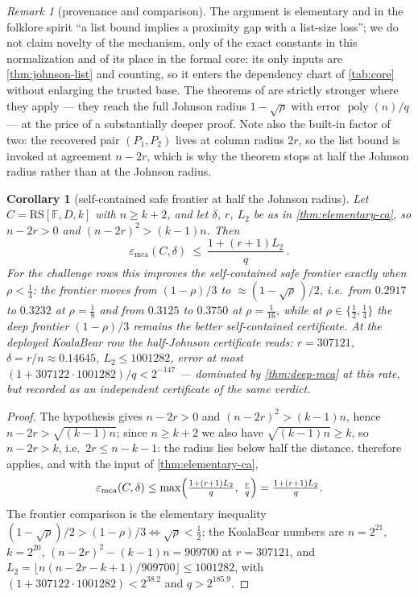 \documentclass[11pt]{article}
\newtheorem{corollary}[theorem]{Corollary}
\theoremstyle{definition}
\theoremstyle{remark}
\newtheorem{remark}[theorem]{Remark}
\newcommand{\F}{\mathbb{F}}
\newcommand{\RS}{\mathrm{RS}}
\newcommand{\emca}{\varepsilon_{\mathrm{mca}}}
\begin{document}
\begin{remark}[provenance and comparison]\label{rem:ca-provenance}
The argument is elementary and in the folklore spirit ``a list bound implies a proximity gap with a list-size loss''; we do not claim novelty of the mechanism, only of the exact constants in this normalization and of its place in the formal core: its only inputs are \cref{thm:johnson-list} and counting, so it enters the dependency chart of \cref{tab:core} without enlarging the trusted base. The theorems of \cite{BCIKS20,BCHKS25} are strictly stronger where they apply --- they reach the full Johnson radius $1-\sqrt\rho$ with error $\operatorname{poly}(n)/q$ --- at the price of a substantially deeper proof. Note also the built-in factor of two: the recovered pair $(P_1,P_2)$ lives at column radius $2r$, so the list bound is invoked at agreement $n-2r$, which is why the theorem stops at half the Johnson radius rather than at the Johnson radius.
\end{remark}

\begin{corollary}[self-contained safe frontier at half the Johnson radius]\label{cor:self-contained-safe}
Let $C=\RS[\F,D,k]$ with $n\ge k+2$, and let $\delta$, $r$, $L_2$ be as in \cref{thm:elementary-ca}, so $n-2r>0$ and $(n-2r)^2>(k-1)n$. Then
\[
\emca(C,\delta)\ \le\ \frac{1+(r+1)L_2}{q}\,.
\]
For the challenge rows this improves the self-contained safe frontier exactly when $\rho<\tfrac14$: the frontier moves from $(1-\rho)/3$ to $\approx(1-\sqrt\rho\,)/2$, i.e.\ from $0.2917$ to $0.3232$ at $\rho=\tfrac18$ and from $0.3125$ to $0.3750$ at $\rho=\tfrac1{16}$, while at $\rho\in\{\tfrac12,\tfrac14\}$ the deep frontier $(1-\rho)/3$ remains the better self-contained certificate. At the deployed KoalaBear row the half-Johnson certificate reads: $r=307121$, $\delta=r/n\approx0.14645$, $L_2\le1001282$, error at most $(1+307122\cdot1001282)/q<2^{-147}$ --- dominated by \cref{thm:deep-mca} at this rate, but recorded as an independent certificate of the same verdict.
\end{corollary}

\begin{proof}
The hypothesis gives $n-2r>0$ and $(n-2r)^2>(k-1)n$, hence $n-2r>\sqrt{(k-1)n}$; since $n\ge k+2$ we also have $\sqrt{(k-1)n}\ge k$, so $n-2r>k$, i.e.\ $2r\le n-k-1$: the radius lies below half the distance.  therefore applies, and with the input of \cref{thm:elementary-ca},
\[
\emca(C,\delta)\le\max\Bigl(\tfrac{1+(r+1)L_2}{q},\ \tfrac rq\Bigr)=\tfrac{1+(r+1)L_2}{q}.
\]
The frontier comparison is the elementary inequality $(1-\sqrt\rho)/2>(1-\rho)/3\iff\sqrt\rho<\tfrac12$; the KoalaBear numbers are $n=2^{21}$, $k=2^{20}$, $(n-2r)^2-(k-1)n=909700$ at $r=307121$, and $L_2=\lfloor n(n-2r-k+1)/909700\rfloor\le1001282$, with $(1+307122\cdot1001282)<2^{38.2}$ and $q>2^{185.9}$.
\end{proof}
\end{document}
